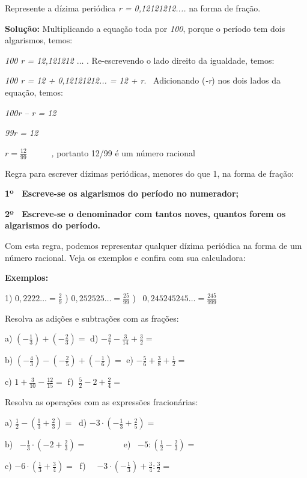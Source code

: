 \begin{texemplo}
Represente a dízima periódica \textit{r = 0,12121212....} na forma de fração.

\textbf{Solução: }Multiplicando a equação toda por \textit{100}, porque o período tem dois algarismos, temos:

\quad \textit{100 r = 12,121212 $ \ldots $ } . Re-escrevendo o lado direito da igualdade, temos:\quad 

\quad \textit{100 r = 12 + 0,12121212... = 12 + r}.~ Adicionando (\textit{-r}) nos dois lados da equação, temos:

\quad \textit{100r – r = 12}

\textit{\quad 99r = 12}

\quad  \( r=\frac{12}{99}~~~ \) \textit{~~~ ,} portanto 12/99 é um número racional\textit{\qedsymbol{}}
\end{texemplo}
\quad Regra para escrever dízimas periódicas, menores do que 1, na forma de fração:

\begin{caixa}

\textbf{1º~  Escreve-se os algarismos do período no numerador;}

\textbf{2º~  Escreve-se o denominador com tantos noves, quantos forem os algarismos do período.}

\end{caixa}
\quad Com esta regra, podemos representar qualquer dízima periódica na forma de um número racional. Veja os exemplos e confira com sua calculadora:

\textbf{Exemplos:}

1)  \( 0,2222 \ldots =\frac{2}{9} \)  \quad {})  \( 0,252525 \ldots =\frac{25}{99} \) \quad {})~  \( 0,245245245 \ldots =\frac{245}{999} \) 

\begin{exercicios}

	\exitem{} Resolva as adições e subtrações com as frações:

a)\textbf{  \(  \left( -\frac{1}{3} \right) + \left( -\frac{2}{3} \right) = \) \quad \quad \quad }d){   \( -\frac{2}{7}-\frac{3}{14}+\frac{3}{2}= \) }

b){   \(  \left( -\frac{4}{3} \right) - \left( -\frac{2}{5} \right) + \left( -\frac{1}{6} \right) = \) \quad e)  \( -\frac{5}{6}+\frac{3}{8}+\frac{1}{2}= \) }

c)  \( 1+\frac{3}{10}-\frac{12}{15}= \) \quad \quad \quad f){   \( ~\frac{5}{2}-2+\frac{2}{4}= \) }

	\exitem{} Resolva as operações com as expressões fracionárias:

a)\textbf{  \( \frac{1}{2}- \left( \frac{1}{3}+\frac{2}{3} \right) =~  \) \quad \quad \quad }d)\textbf{  \( -3 \cdot  \left( -\frac{1}{3}+\frac{2}{5} \right) =~  \) \quad }

b)~  \( -\frac{1}{3} \cdot  \left( -2+\frac{2}{3} \right) =~  \) ~~~~~~~ \quad \quad e)~  \( -5: \left( \frac{1}{2}-\frac{2}{3} \right) =~~  \) 

c)  \( -6 \cdot  \left( \frac{1}{3}+\frac{3}{4} \right) =~  \) \quad \quad \quad f)~~  \( -3 \cdot  \left( -\frac{1}{3} \right) +\frac{3}{4}:\frac{3}{2}=~  \) ~~~~~~~ 
\end{exercicios}

